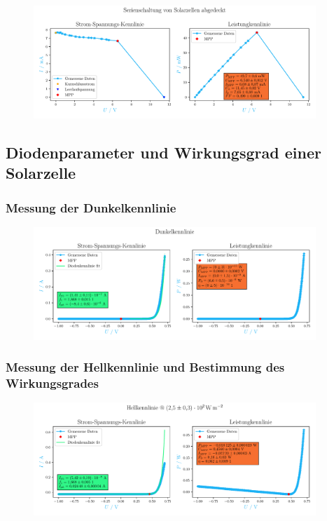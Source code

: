 \documentclass[12pt,english,ngerman]{scrartcl}
\begin{document}
\begin{figure}[H]
	\centering
	\includegraphics[width=0.95\textwidth]{figures/serienschaltungAbgedeckt.pdf}
	\caption{}\label{fig:auws_kennlinie_abgedeckt}
\end{figure}

\subsection{Diodenparameter und Wirkungsgrad einer Solarzelle}

\subsubsection{Messung der Dunkelkennlinie}

\begin{figure}[H]
	\centering
	\includegraphics[width=0.95\textwidth]{figures/dunkelkennlinie.pdf}
	\caption{}\label{fig:ausw_kennlinie_dunkel}
\end{figure}

\subsubsection{Messung der Hellkennlinie und Bestimmung des Wirkungsgrades}

\begin{figure}[H]
	\centering
	\includegraphics[width=0.95\textwidth]{figures/helllampe.pdf}
	\caption{}\label{fig:ausw_kennlinie_hell_lampe}
\end{figure}
\end{document}
